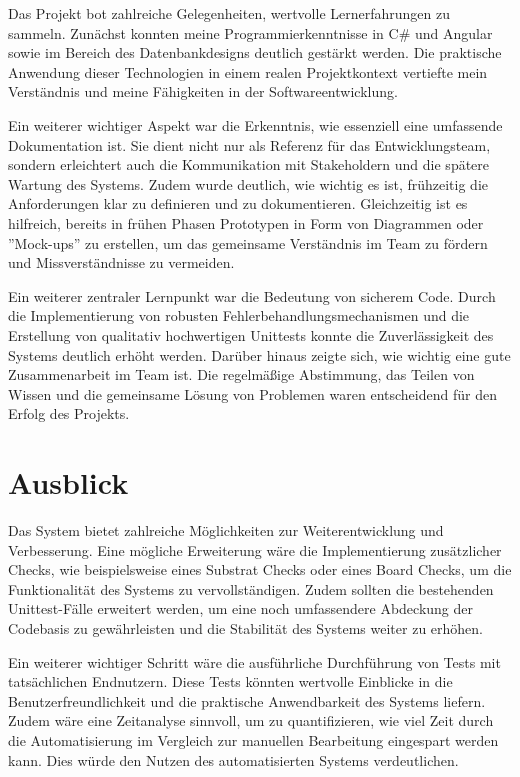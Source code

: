 Das Projekt bot zahlreiche Gelegenheiten, wertvolle Lernerfahrungen zu sammeln. Zunächst konnten meine Programmierkenntnisse in C\# und Angular sowie im Bereich des Datenbankdesigns deutlich gestärkt werden. Die praktische Anwendung dieser Technologien in einem realen Projektkontext vertiefte mein Verständnis und meine Fähigkeiten in der Softwareentwicklung.

Ein weiterer wichtiger Aspekt war die Erkenntnis, wie essenziell eine umfassende Dokumentation ist. Sie dient nicht nur als Referenz für das Entwicklungsteam, sondern erleichtert auch die Kommunikation mit Stakeholdern und die spätere Wartung des Systems. Zudem wurde deutlich, wie wichtig es ist, frühzeitig die Anforderungen klar zu definieren und zu dokumentieren. Gleichzeitig ist es hilfreich, bereits in frühen Phasen Prototypen in Form von Diagrammen oder ''Mock-ups'' zu erstellen, um das gemeinsame Verständnis im Team zu fördern und Missverständnisse zu vermeiden.

Ein weiterer zentraler Lernpunkt war die Bedeutung von sicherem Code. Durch die Implementierung von robusten Fehlerbehandlungsmechanismen und die Erstellung von qualitativ hochwertigen Unittests konnte die Zuverlässigkeit des Systems deutlich erhöht werden.  Darüber hinaus zeigte sich, wie wichtig eine gute Zusammenarbeit im Team ist. Die regelmäßige Abstimmung, das Teilen von Wissen und die gemeinsame Lösung von Problemen waren entscheidend für den Erfolg des Projekts.

\section{Ausblick}

Das System bietet zahlreiche Möglichkeiten zur Weiterentwicklung und Verbesserung. Eine mögliche Erweiterung wäre die Implementierung zusätzlicher Checks, wie beispielsweise eines Substrat Checks oder eines Board Checks, um die Funktionalität des Systems zu vervollständigen. Zudem sollten die bestehenden Unittest-Fälle erweitert werden, um eine noch umfassendere Abdeckung der Codebasis zu gewährleisten und die Stabilität des Systems weiter zu erhöhen.

Ein weiterer wichtiger Schritt wäre die ausführliche Durchführung von Tests mit tatsächlichen Endnutzern. Diese Tests könnten wertvolle Einblicke in die Benutzerfreundlichkeit und die praktische Anwendbarkeit des Systems liefern. Zudem wäre eine Zeitanalyse sinnvoll, um zu quantifizieren, wie viel Zeit durch die Automatisierung im Vergleich zur manuellen Bearbeitung eingespart werden kann. Dies würde den Nutzen des automatisierten Systems verdeutlichen. 

